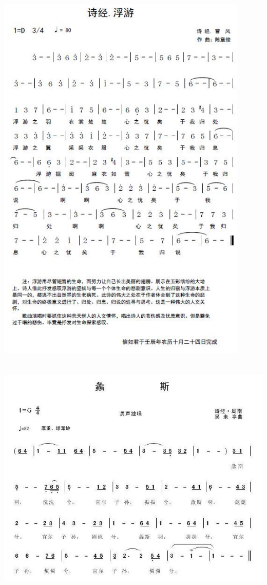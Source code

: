 \documentclass[cn,pad,twocol]{elegantbook}
\begin{document}
\section{}      \includegraphics[width=0.9\textwidth]{rpi400/20210123-蜉蝣.jpg}
\section{}      \includegraphics[width=\textwidth]{rpi400/20210123-螽斯.jpg}
\end{document}
